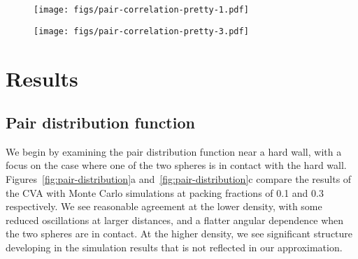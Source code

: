 \documentclass[letterpaper,twocolumn,amsmath,amssymb,pre,aps,10pt]{revtex4-1}
\newcommand{\rr}{\textbf{r}}
\begin{document}
\begin{figure*}
  \begin{subfigure}{\textwidth}
    \texttt{[image: figs/pair-correlation-pretty-1.pdf]}
    \vspace{-0.6cm}
  \end{subfigure}
  \begin{subfigure}{\textwidth}
    \texttt{[image: figs/pair-correlation-pretty-3.pdf]}
    \vspace{-0.6cm}
  \end{subfigure}
  \caption{The pair distribution function near a hard wall, with
    packing fractions of 0.1 and 0.3 and $\rr_1$ in contact with the
    hard wall.  On the left are 2D plots of $g^{(2)}(\rr_1,\rr_2)$ as
    $\rr_2$ varies. \plotcomp{$g^{(2)}(\rr_1,\rr_2)$}.}
  \label{fig:pair-distribution}
\end{figure*}
\section{Results}

\subsection{Pair distribution function}


We begin by examining the pair distribution function near a hard wall,
with a focus on the case where one of the two spheres is in contact
with the hard wall.  Figures~\ref{fig:pair-distribution}a
and~\ref{fig:pair-distribution}c compare the results of the CVA with
Monte Carlo simulations at packing fractions of 0.1 and 0.3
respectively. We see reasonable agreement at the lower density, with
some reduced oscillations at larger distances, and a flatter angular
dependence when the two spheres are in contact.  At the higher
density, we see significant structure developing in the simulation
results that is not reflected in our approximation.
\end{document}
